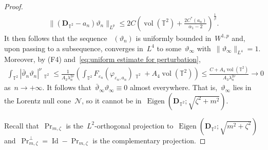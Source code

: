 \documentclass[10pt,a4paper]{amsart}
\newcommand{\C}{\mathbb{C}}
\newcommand{\T}{\mathbb{T}}
\newcommand{\dd}{\mathop{}\!\mathrm{d}}
\newcommand{\eps}{\varepsilon}
\newcommand{\pD}{\mathbf{D}}
\newcommand{\parenthesis}[1]{\left(#1\right)} %
\newcommand{\braces}[1]{\left\{#1\right\}} %
\DeclareMathOperator{\dv}{\dd{vol}}
\DeclareMathOperator{\Eigen}{Eigen}
\DeclareMathOperator{\id}{Id}
\DeclareMathOperator{\proj}{Pr}
\DeclareMathOperator{\Span}{Span}
\DeclareMathOperator{\vol}{vol}
\begin{document}
\begin{proof}
\begin{align}
    \|(\pD_{\T^2}-a_n)\vartheta_n\|_{L^p} \leq 2C \parenthesis{ \vol(\mathbb{T}^2)+\frac{2 C^*(a_n)}{\alpha_1-2} }^{\frac{1}{\beta}}.
\end{align}
It then follows that the sequence ~$(\vartheta_n)$ is uniformly bounded in~$W^{1,p}$ and,  upon passing to a subsequence, converges in~$L^4$ to some~$\vartheta_\infty$ with~$\|\vartheta_\infty\|_{L^4}=1$.
Moreover, by (F4) and~\eqref{eq:uniform estimate for perturbation}, 
\begin{align}
    \int_{\mathbb{T}^2} |\bar{\vartheta}_{n}\vartheta_{n}|^\nu\dv_{\T^2} \leq \frac{1}{A_3\lambda_n^{2\nu}} \parenthesis{ \int_{\mathbb{T}^2} F_{\eps_n}(\varphi_{\eps_n,a_n})\dv_{\T^2} + A_4\vol(\mathbb{T}^2)}
    \leq \frac{C+A_4 \vol(\mathbb{T}^2)}{A_3\lambda_n^{2\nu}}\to 0
\end{align}
as~$n\to+\infty$.
It follows that~$\bar{\vartheta}_\infty\vartheta_\infty\equiv 0$ almost everywhere. 
That is,~$\vartheta_\infty$ lies in the Lorentz null cone~$\mathcal{N}$,
so it cannot be in~$\Eigen(\pD_{\T^2};\sqrt{\zeta^2+m^2})$.


Recall that~$\proj_{m,\zeta}$ is the~$L^2$-orthogonal projection to~$\Eigen(\pD_{\T^2};\sqrt{m^2+\zeta^2})$ and~$\proj_{m,\zeta}^\perp = \id -\proj_{m,\zeta}$ is the complementary projection.


\end{proof}
\end{document}
